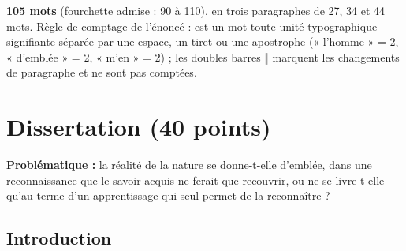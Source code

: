 \documentclass[11pt,a4paper]{article}
\begin{document}
\textbf{105 mots} (fourchette admise : 90 à 110), en trois paragraphes de 27, 34 et 44 mots. Règle de comptage de l'énoncé : est un mot toute unité typographique signifiante séparée par une espace, un tiret ou une apostrophe (« l'homme » = 2, « d'emblée » = 2, « m'en » = 2) ; les doubles barres ‖ marquent les changements de paragraphe et ne sont pas comptées.

\hypertarget{dissertation-40-points}{%
\section{Dissertation (40 points)}\label{dissertation-40-points}}

\textbf{Problématique :} la réalité de la nature se donne-t-elle d'emblée, dans une reconnaissance que le savoir acquis ne ferait que recouvrir, ou ne se livre-t-elle qu'au terme d'un apprentissage qui seul permet de la reconnaître ?

\hypertarget{introduction}{%
\subsection{Introduction}\label{introduction}}
\end{document}
